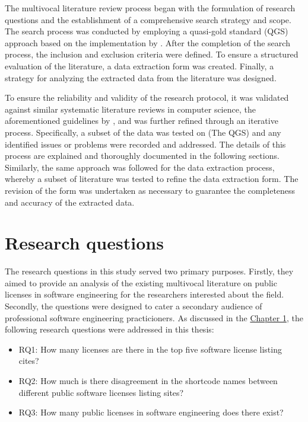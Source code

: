 The multivocal literature review process began with the formulation of research questions and the establishment of a comprehensive search strategy and scope. The search process was conducted by employing a quasi-gold standard (QGS) approach based on the implementation by \cite{qgs}. After the completion of the search process, the inclusion and exclusion criteria were defined. To ensure a structured evaluation of the literature, a data extraction form was created. Finally, a strategy for analyzing the extracted data from the literature was designed.

 To ensure the reliability and validity of the research protocol, it was validated against similar systematic literature reviews in computer science, the aforementioned guidelines by \cite{kitchenham2007}, and was further refined through an iterative process. Specifically, a subset of the data was tested on (The QGS) and any identified issues or problems were recorded and addressed. The details of this process are explained and thoroughly documented in the following sections. Similarly, the same approach was followed for the data extraction process, whereby a subset of literature was tested to refine the data extraction form. The revision of the form was undertaken as necessary to guarantee the completeness and accuracy of the extracted data.

\section{Research questions}
The research questions in this study served two primary purposes. Firstly, they aimed to provide an analysis of the existing multivocal literature on public licenses in software engineering for the researchers interested about the field. Secondly, the questions were designed to cater a secondary audience of professional software engineering practicioners. As discussed in the \hyperref[intro]{Chapter 1}, the following research questions were addressed in this thesis:

\begin{itemize}
	\item RQ1: How many licenses are there in the top five software license listing cites?
	\item RQ2: How much is there disagreement in the shortcode names between different public software licenses listing sites?
	\item RQ3: How many public licenses in software engineering does there exist?
\end{itemize}

